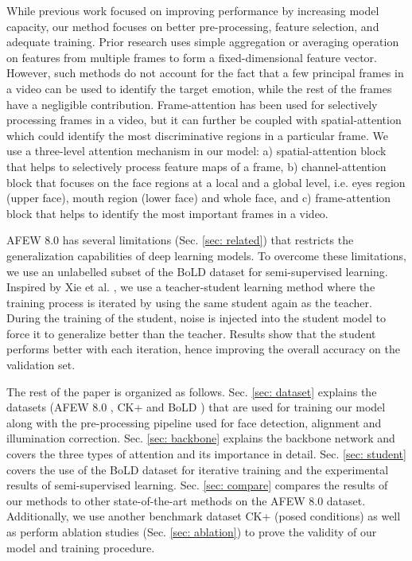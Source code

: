 \documentclass[runningheads]{llncs}
\begin{document}
While previous work focused on improving performance by increasing model capacity, our method focuses on better pre-processing, feature selection, and adequate training. Prior research \cite{littlewort2004dynamics,shan2009facial,knyazev2017convolutional,tang2013deep} uses simple aggregation or averaging operation on features from multiple frames to form a fixed-dimensional feature vector. However, such methods do not account for the fact that a few principal frames in a video can be used to identify the target emotion, while the rest of the frames have a negligible contribution. Frame-attention has been used \cite{meng2019frame} for selectively processing frames in a video, but it can further be coupled with spatial-attention which could identify the most discriminative regions in a particular frame. We use a three-level attention mechanism in our model: a) spatial-attention block that helps to selectively process feature maps of a frame, b) channel-attention block that focuses on the face regions at a local and a global level, i.e. eyes region (upper face), mouth region (lower face) and whole face, and c) frame-attention block that helps to identify the most important frames in a video.

AFEW 8.0 \cite{dhall2012collecting} has several limitations (Sec. \ref{sec: related}) that restricts the generalization capabilities of deep learning models. To overcome these limitations, we use an unlabelled subset of the BoLD dataset \cite{luo2020arbee} for semi-supervised learning. Inspired by Xie et al. \cite{xie2019self}, we use a teacher-student learning method where the training process is iterated by using the same student again as the teacher. During the training of the student, noise is injected into the student model to force it to generalize better than the teacher. Results show that the student performs better with each iteration, hence improving the overall accuracy on the validation set.


The rest of the paper is organized as follows. Sec. \ref{sec: dataset} explains the datasets (AFEW 8.0 \cite{dhall2012collecting}, CK+ \cite{lucey2010extended} and BoLD \cite{luo2020arbee}) that are used for training our model along with the pre-processing pipeline used for face detection, alignment and illumination correction. Sec. \ref{sec: backbone} explains the backbone network and covers the three types of attention and its importance in detail. Sec. \ref{sec: student} covers the use of the BoLD dataset for iterative training and the experimental results of semi-supervised learning. Sec. \ref{sec: compare} compares the results of our methods to other state-of-the-art methods on the AFEW 8.0 dataset. Additionally, we use another benchmark dataset CK+ \cite{lucey2010extended} (posed conditions) as well as perform ablation studies (Sec. \ref{sec: ablation}) to prove the validity of our model and training procedure.
\end{document}
